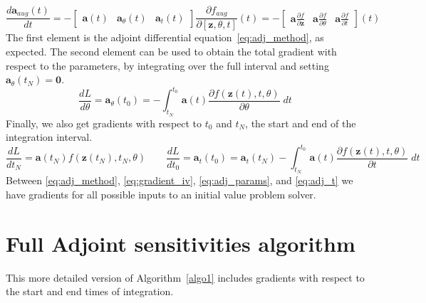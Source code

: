 \documentclass{article}
\newcommand{\va}{\mathbf{a}}
\newcommand{\vz}{\mathbf{z}}
\newcommand{\sol}{\vz}  %
\newcommand{\adj}{\va}
\begin{document}
\begin{appendices}
\begin{equation}
\frac{d\adj_{aug}(t)}{dt} = - \begin{bmatrix}
\adj(t) & \adj_\theta(t) & \adj_t(t)
\end{bmatrix} \frac{\partial f_{aug}}{\partial [\sol, \theta, t]}(t) = - \begin{bmatrix}
\adj \frac{\partial f}{\partial \sol} &
\adj \frac{\partial f}{\partial \theta} &
\adj \frac{\partial f}{\partial t}
\end{bmatrix}(t)
\end{equation}
The first element is the adjoint differential equation~\eqref{eq:adj_method}, as expected. The second element can be used to obtain the total gradient with respect to the parameters, by integrating over the full interval and setting $\adj_\theta(t_N) = \mathbf{0}$.
\begin{equation}\label{eq:adj_params}
\frac{dL}{d\theta} = \adj_\theta(t_0) = - \int_{t_N}^{t_0} \adj(t)\frac{\partial f(\sol(t), t, \theta)}{\partial \theta} \;dt
\end{equation}
Finally, we also get gradients with respect to $t_0$ and $t_N$, the start and end of the integration interval.
\begin{equation}\label{eq:adj_t}
\frac{dL}{dt_N} = \adj(t_N) f(\sol(t_N), t_N, \theta) \quad\quad \frac{dL}{dt_0} = \adj_t(t_0) = \adj_t(t_N) - \int_{t_N}^{t_0} \adj(t) \frac{\partial f(\sol(t), t, \theta)}{\partial t} \;dt
\end{equation}
Between \eqref{eq:adj_method}, \eqref{eq:gradient_iv}, \eqref{eq:adj_params}, and \eqref{eq:adj_t} we have gradients for all possible inputs to an initial value problem solver.

\section{Full Adjoint sensitivities algorithm}

This more detailed version of Algorithm~\ref{algo1} includes gradients with respect to the start and end times of integration.


\end{appendices}
\end{document}
